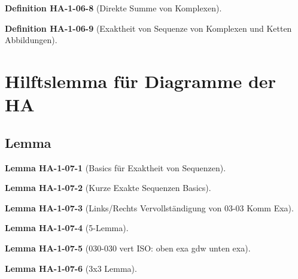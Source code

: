 \documentclass[10pt, letterpaper]{article}
\newcommand{\CustomHeading}[3]{%
  \par\medskip\noindent%
  \textbf{#1 #2} \textnormal{(#3)}.\enskip%
}
\newenvironment{DEF}[2]{\CustomHeading{Definition}{#1}{#2}}{}
\newenvironment{LEM}[2]{\CustomHeading{Lemma}{#1}{#2}}{}
\begin{document}
\begin{DEF}{HA-1-06-8}{Direkte Summe von Komplexen}

\end{DEF}

\begin{DEF}{HA-1-06-9}{Exaktheit von Sequenze von Komplexen und Ketten Abbildungen}

\end{DEF}






















\section{Hilftslemma für Diagramme der HA}

\subsection{Lemma}



\begin{LEM}{HA-1-07-1}{Basics für Exaktheit von Sequenzen}

\end{LEM}

\begin{LEM}{HA-1-07-2}{Kurze Exakte Sequenzen Basics}

\end{LEM}

\begin{LEM}{HA-1-07-3}{Links/Rechts Vervollständigung von 03-03 Komm Exa}

\end{LEM}

\begin{LEM}{HA-1-07-4}{5-Lemma}

\end{LEM}

\begin{LEM}{HA-1-07-5}{030-030 vert ISO: oben exa gdw unten exa}

\end{LEM}

\begin{LEM}{HA-1-07-6}{3x3 Lemma}

\end{LEM}
\end{document}
